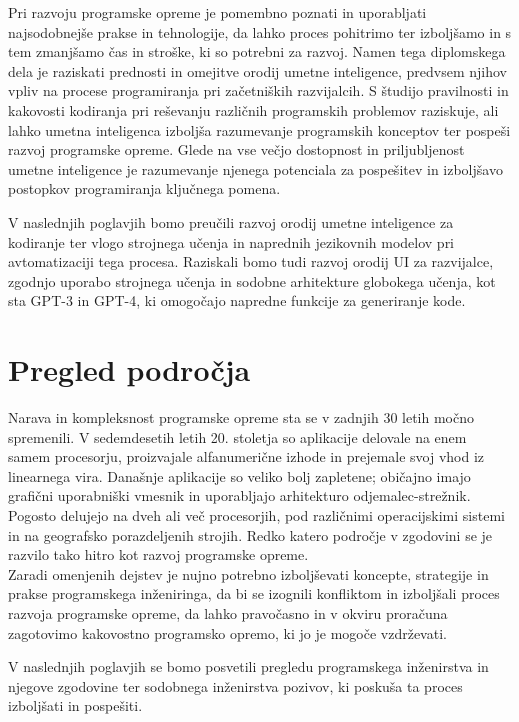 \documentclass[a4paper,12pt,openright]{book}
\begin{document}
Pri razvoju programske opreme je pomembno poznati in uporabljati najsodobnejše prakse in tehnologije, da lahko proces pohitrimo ter izboljšamo in s tem zmanjšamo čas in stroške, ki so potrebni za razvoj.
Namen tega diplomskega dela je raziskati prednosti in omejitve orodij umetne inteligence, predvsem njihov vpliv na procese programiranja  pri začetniških razvijalcih. S študijo pravilnosti in kakovosti kodiranja pri reševanju različnih programskih problemov raziskuje, ali lahko umetna inteligenca izboljša razumevanje programskih konceptov ter pospeši razvoj programske opreme. Glede na vse večjo dostopnost in priljubljenost umetne inteligence je razumevanje njenega potenciala za pospešitev in izboljšavo postopkov programiranja ključnega pomena.

V naslednjih poglavjih bomo preučili razvoj orodij umetne inteligence za kodiranje ter vlogo strojnega učenja in naprednih jezikovnih modelov pri avtomatizaciji tega procesa. Raziskali bomo tudi razvoj orodij UI za razvijalce, zgodnjo uporabo strojnega učenja in sodobne arhitekture globokega učenja, kot sta GPT-3 in GPT-4, ki omogočajo napredne funkcije za generiranje kode.



\chapter{Pregled področja}
Narava in kompleksnost programske opreme sta se v zadnjih 30 letih močno spremenili. V sedemdesetih letih 20. stoletja so aplikacije delovale na enem samem procesorju, proizvajale alfanumerične izhode in prejemale svoj vhod iz linearnega vira. Današnje aplikacije so veliko bolj zapletene; običajno imajo grafični uporabniški vmesnik in uporabljajo arhitekturo odjemalec-strežnik. Pogosto delujejo na dveh ali več procesorjih, pod različnimi operacijskimi sistemi in na geografsko porazdeljenih strojih. Redko katero področje v zgodovini se je  razvilo tako hitro kot razvoj programske opreme. \cite{aggarwal2005software}
\\
Zaradi omenjenih dejstev je nujno potrebno izboljševati koncepte, strategije in prakse programskega inženiringa, da bi se izognili konfliktom in izboljšali proces razvoja programske opreme, da lahko pravočasno in v okviru proračuna zagotovimo kakovostno programsko opremo, ki jo je mogoče vzdrževati.

V naslednjih poglavjih se bomo posvetili pregledu programskega inženirstva in njegove zgodovine ter sodobnega inženirstva pozivov, ki poskuša ta proces izboljšati in pospešiti. 
\pagebreak
\end{document}
